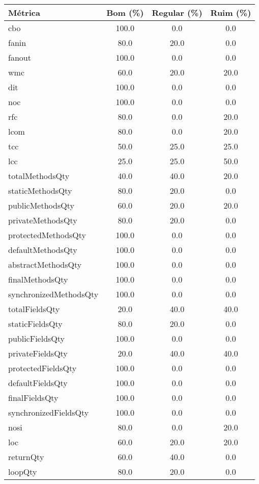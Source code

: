 \begin{tabular}{lccc}
                \toprule
                \textbf{Métrica} & \textbf{Bom (\%)} & \textbf{Regular (\%)} & \textbf{Ruim (\%)} \\
                \midrule
                cbo & 100.0 & 0.0 & 0.0 \\
fanin & 80.0 & 20.0 & 0.0 \\
fanout & 100.0 & 0.0 & 0.0 \\
wmc & 60.0 & 20.0 & 20.0 \\
dit & 100.0 & 0.0 & 0.0 \\
noc & 100.0 & 0.0 & 0.0 \\
rfc & 80.0 & 0.0 & 20.0 \\
lcom & 80.0 & 0.0 & 20.0 \\
tcc & 50.0 & 25.0 & 25.0 \\
lcc & 25.0 & 25.0 & 50.0 \\
totalMethodsQty & 40.0 & 40.0 & 20.0 \\
staticMethodsQty & 80.0 & 20.0 & 0.0 \\
publicMethodsQty & 60.0 & 20.0 & 20.0 \\
privateMethodsQty & 80.0 & 20.0 & 0.0 \\
protectedMethodsQty & 100.0 & 0.0 & 0.0 \\
defaultMethodsQty & 100.0 & 0.0 & 0.0 \\
abstractMethodsQty & 100.0 & 0.0 & 0.0 \\
finalMethodsQty & 100.0 & 0.0 & 0.0 \\
synchronizedMethodsQty & 100.0 & 0.0 & 0.0 \\
totalFieldsQty & 20.0 & 40.0 & 40.0 \\
staticFieldsQty & 80.0 & 20.0 & 0.0 \\
publicFieldsQty & 100.0 & 0.0 & 0.0 \\
privateFieldsQty & 20.0 & 40.0 & 40.0 \\
protectedFieldsQty & 100.0 & 0.0 & 0.0 \\
defaultFieldsQty & 100.0 & 0.0 & 0.0 \\
finalFieldsQty & 100.0 & 0.0 & 0.0 \\
synchronizedFieldsQty & 100.0 & 0.0 & 0.0 \\
nosi & 80.0 & 0.0 & 20.0 \\
loc & 60.0 & 20.0 & 20.0 \\
returnQty & 60.0 & 40.0 & 0.0 \\
loopQty & 80.0 & 20.0 & 0.0 \\

\end{tabular}
